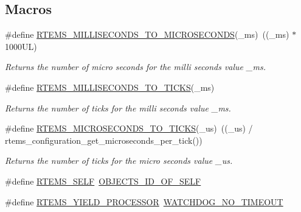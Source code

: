\subsection*{Macros}
\begin{DoxyCompactItemize}
\item 
\mbox{\label{group__ClassicTasks_ga2dcbebc82b2bfdc34b6d78a52aa93f80}} 
\#define \mbox{\hyperlink{group__ClassicTasks_ga2dcbebc82b2bfdc34b6d78a52aa93f80}{R\+T\+E\+M\+S\+\_\+\+M\+I\+L\+L\+I\+S\+E\+C\+O\+N\+D\+S\+\_\+\+T\+O\+\_\+\+M\+I\+C\+R\+O\+S\+E\+C\+O\+N\+DS}}(\+\_\+ms)~((\+\_\+ms) $\ast$ 1000\+U\+L)
\begin{DoxyCompactList}\small\item\em Returns the number of micro seconds for the milli seconds value {\itshape \+\_\+ms}. \end{DoxyCompactList}\item 
\#define \mbox{\hyperlink{group__ClassicTasks_gad2ac8e783e2e6cd6e265a54034dbbdc4}{R\+T\+E\+M\+S\+\_\+\+M\+I\+L\+L\+I\+S\+E\+C\+O\+N\+D\+S\+\_\+\+T\+O\+\_\+\+T\+I\+C\+KS}}(\+\_\+ms)
\begin{DoxyCompactList}\small\item\em Returns the number of ticks for the milli seconds value {\itshape \+\_\+ms}. \end{DoxyCompactList}\item 
\mbox{\label{group__ClassicTasks_gabed054d2cb6ebdaf0beb02d7e7e4504b}} 
\#define \mbox{\hyperlink{group__ClassicTasks_gabed054d2cb6ebdaf0beb02d7e7e4504b}{R\+T\+E\+M\+S\+\_\+\+M\+I\+C\+R\+O\+S\+E\+C\+O\+N\+D\+S\+\_\+\+T\+O\+\_\+\+T\+I\+C\+KS}}(\+\_\+us)~((\+\_\+us) / rtems\+\_\+configuration\+\_\+get\+\_\+microseconds\+\_\+per\+\_\+tick())
\begin{DoxyCompactList}\small\item\em Returns the number of ticks for the micro seconds value {\itshape \+\_\+us}. \end{DoxyCompactList}\item 
\#define \mbox{\hyperlink{group__ClassicTasks_ga8a1cff22846976c3f4df8a8d50fdc4dc}{R\+T\+E\+M\+S\+\_\+\+S\+E\+LF}}~\mbox{\hyperlink{group__RTEMSScoreObject_ga2454d6c322916168e6924f5ff26ab393}{O\+B\+J\+E\+C\+T\+S\+\_\+\+I\+D\+\_\+\+O\+F\+\_\+\+S\+E\+LF}}
\item 
\#define \mbox{\hyperlink{group__ClassicTasks_gab8389262bfd555f0b1515a568bc97b07}{R\+T\+E\+M\+S\+\_\+\+Y\+I\+E\+L\+D\+\_\+\+P\+R\+O\+C\+E\+S\+S\+OR}}~\mbox{\hyperlink{group__RTEMSScoreWatchdog_gaa7a11d3dcb3ba512032421888d16b327}{W\+A\+T\+C\+H\+D\+O\+G\+\_\+\+N\+O\+\_\+\+T\+I\+M\+E\+O\+UT}}

\end{DoxyCompactItemize}
